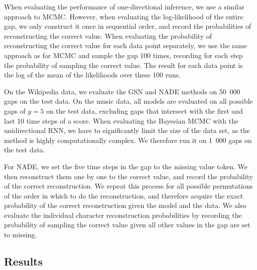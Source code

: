 \documentclass{article}
\begin{document}
When evaluating the performance of one-directional inference, we use a similar approach to MCMC. However, when evaluating the log-likelihood of the entire gap, we only construct it once in sequential order, and record the probabilities of reconstructing the correct value. When evaluating the probability of reconstructing the correct value for each data point separately, we use the same approach as for MCMC and sample the gap 100 times, recording for each step the probability of sampling the correct value. The result for each data point is the log of the mean of the likelihoods over these 100 runs.

On the Wikipedia data, we evaluate the GSN and NADE methods on 50~000 gaps on 
the test data. On the music data, all models are evaluated on all possible 
gaps of $g=5$ on the test data, excluding gaps that intersect with the first and 
last 10 time steps of a score. When evaluating the Bayesian MCMC with the unidirectional 
RNN, we have to significantly limit the size of the data set, as the method is 
highly computationally complex. We therefore run it on 1~000 gaps on the test 
data.

For NADE, we set the five time steps in the gap to the missing value token. We 
then reconstruct them one by one to the correct value, and record the 
probability of the correct reconstruction. We repeat this process for all 
possible permutations of the order in which to do the reconstruction, and 
therefore acquire the exact probability of the correct reconstruction given the 
model and the data. We also evaluate the individual character reconstruction 
probabilities by recording the probability of sampling the correct value given 
all other values in the gap are set to missing.

\subsection{Results}
\end{document}
